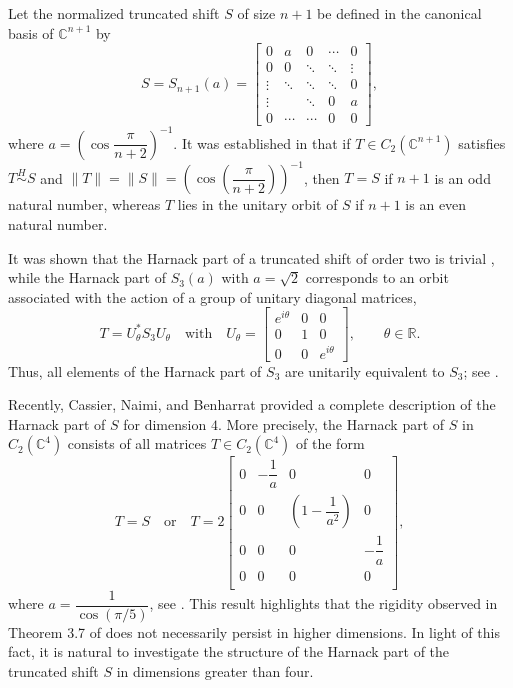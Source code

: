 \documentclass[12pt, reqno]{amsart}
\theoremstyle{definition}
\theoremstyle{remark}
\numberwithin{equation}{section}
\begin{document}
Let the normalized truncated shift $S$ of size $n+1$ be defined in the canonical basis of $\mathbb{C}^{n+1}$ by
\begin{equation}\label{S-truncated shift n+1}
	S = S_{n+1}(a) = \begin{bmatrix}
		0 & a & 0 & \cdots & 0 \\
		0 & 0 & \ddots & \ddots & \vdots \\
		\vdots & \ddots & \ddots & \ddots & 0 \\
		\vdots & & \ddots & 0 & a \\
		0 & \cdots & \cdots & 0 & 0
	\end{bmatrix},
\end{equation} 
where $a = \left(\cos\dfrac{\pi}{n+2}\right)^{-1}$. 
It was established in \cite[Theorem 3.7]{CassierBenharrat2020} that if $T \in C_2(\mathbb{C}^{n+1})$ satisfies $T \stackrel{H}{\sim} S$ and $\|T\| = \|S\| = \left(\cos\left(\dfrac{\pi}{n+2}\right)\right)^{-1}$, then $T=S$ if $n+1$ is an odd natural number, whereas $T$ lies in the unitary orbit of $S$ if $n+1$ is an even natural number.

It was shown that the Harnack part of a truncated shift of order two is trivial \cite[Theorem 3.3]{CaBeBel2018}, while the Harnack part of $S_3(a)$ with $a=\sqrt{2}$ corresponds to an orbit associated with the action of a group of unitary diagonal matrices,
\begin{equation}\label{S3}
	T = U_{\theta}^{*} S_3 U_\theta \quad \text{with} \quad U_\theta =
	\begin{bmatrix}
		e^{i\theta} & 0 & 0 \\
		0 & 1 & 0 \\
		0 & 0 & e^{i\theta} 
	\end{bmatrix},\qquad \theta \in \mathbb{R}.
\end{equation}
Thus, all elements of the Harnack part of $S_3$ are unitarily equivalent to $S_3$; see \cite[Theorem 3.1]{CaBeBel2018}. 

Recently, Cassier, Naimi, and Benharrat \cite{CaNaBe2024} provided a complete description of the Harnack part of $S$ for dimension $4$. More precisely, the Harnack part of $S$ in $C_2(\mathbb{C}^{4})$ consists of all matrices $T \in C_2(\mathbb{C}^4)$ of the form
\begin{equation*}
	T=S \quad \text{or} \quad T = 2\begin{bmatrix}
		0 & -\dfrac{1}{a} & 0 & 0 \\
		0 & 0 & \left(1-\dfrac{1}{a^2}\right) & 0 \\
		0 & 0 & 0 & -\dfrac{1}{a} \\
		0 & 0 & 0 & 0 \\
	\end{bmatrix},
\end{equation*}
where $a = \dfrac{1}{\cos(\pi/5)}$, see \cite[Theorem 3.3]{CaNaBe2024}.
This result highlights that the rigidity observed in Theorem 3.7 of \cite{CassierBenharrat2020}  does not necessarily persist in higher dimensions. In light of this fact, it is natural to investigate the structure of the Harnack part of the truncated shift $S$ in dimensions greater than four.
\end{document}
